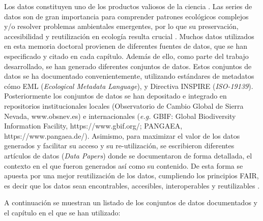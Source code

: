 Los datos constituyen uno de los productos valiosos de la ciencia \autocite{Costelloetal2013BiodiversityData}. Las series de datos son de gran importancia para comprender patrones ecológicos complejos y/o resolver problemas ambientales emergentes, por lo que su preservación, accesibilidad y reutilización en ecología resulta crucial \autocite{PerezLuqueRosCandeira2019CompartiendoDatos}. Muchos datos utilizados en esta memoria doctoral provienen de diferentes fuentes de datos, que se han especificado y citado en cada capítulo. Además de ello, como parte del trabajo desarrollado, se han generado diferentes conjuntos de datos. Estos conjuntos de datos se ha documentado convenientemente, utilizando estándares de metadatos cómo EML (\emph{Ecological Metadata Language}), y Directiva INSPIRE (\emph{ISO-19139}). Posteriormente los conjuntos de datos se han depositado e integrado en repositorios institucionales locales (Observatorio de Cambio Global de Sierra Nevada, www.obsnev.es) e internacionales (\emph{e.g.} GBIF: Global
Biodiversity Information Facility, https://www.gbif.org/; PANGAEA, https://www.pangaea.de/). Asimismo, para maximizar el valor de los datos generados y facilitar su acceso y su re-utilización, se escribieron diferentes artículos de datos (\emph{Data Papers}) donde se documentaron de forma detallada, el contexto en el que fueron generados así como su contenido. De esta forma se apuesta por una mejor reutilización de los datos, cumpliendo los principios FAIR, es decir que los datos sean encontrables, accesibles, interoperables y reutilizables \autocite{Wilkinsonetal2016FAIRGuiding}.

A continuación se muestran un listado de los conjuntos de datos documentados y el capítulo en el que se han utilizado:

